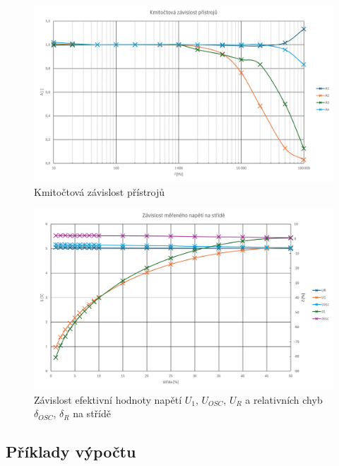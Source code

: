 \documentclass[a4paper, czech]{article}
\begin{document}
\begin{figure}[H]
    \centering
    \includegraphics[width=\textwidth]{graf1.png}
    \caption{Kmitočtová závislost přístrojů}
\end{figure}

\begin{figure}[H]
    \centering
    \includegraphics[width=\textwidth]{graf2.png}
    \caption{Závislost efektivní hodnoty napětí $U_1$, $U_{OSC}$, $U_R$ a relativních chyb $\delta_{OSC}$, $\delta_R$ na střídě}
\end{figure}

\pagebreak

\subsection{Příklady výpočtu}
\end{document}
